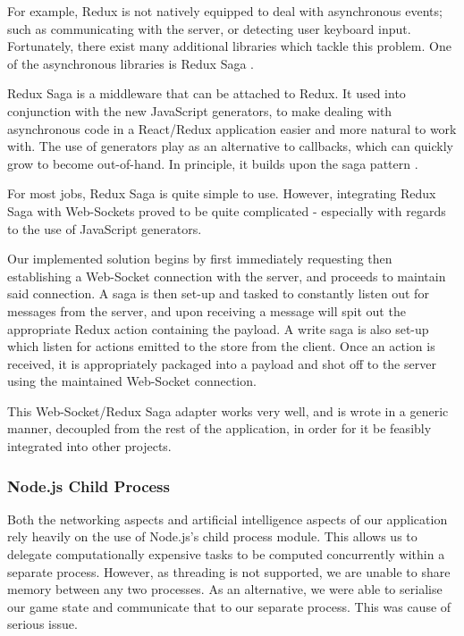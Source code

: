 \documentclass{standalone}
\begin{document}
				For example, Redux is not natively equipped to deal with asynchronous events; such as communicating with the server, or detecting user keyboard input. Fortunately, there exist many additional libraries which tackle this problem. One of the asynchronous libraries is Redux Saga \parencite{reduxSaga}.

				Redux Saga is a middleware that can be attached to Redux. It used into conjunction with the new JavaScript generators, to make dealing with asynchronous code in a React/Redux application easier and more natural to work with. The use of generators play as an alternative to callbacks, which can quickly grow to become out-of-hand. In principle, it builds upon the saga pattern \parencite{sagas}.

				For most jobs, Redux Saga is quite simple to use. However, integrating Redux Saga with Web-Sockets proved to be quite complicated - especially with regards to the use of JavaScript generators.

				Our implemented solution begins by first immediately requesting then establishing a Web-Socket connection with the server, and proceeds to maintain said connection. A saga is then set-up and tasked to constantly listen out for messages from the server, and upon receiving a message will spit out the appropriate Redux action containing the payload. A write saga is also set-up which listen for actions emitted to the store from the client. Once an action is received, it is appropriately packaged into a payload and shot off to the server using the maintained Web-Socket connection.

				This Web-Socket/Redux Saga adapter works very well, and is wrote in a generic manner, decoupled from the rest of the application, in order for it be feasibly integrated into other projects.

			\subsubsection{Node.js Child Process}
				Both the networking aspects and artificial intelligence aspects of our application rely heavily on the use of Node.js's child process module. This allows us to delegate computationally expensive tasks to be computed concurrently within a separate process. However, as threading is not supported, we are unable to share memory between any two processes. As an alternative, we were able to serialise our game state and communicate that to our separate process. This was cause of serious issue. 
\end{document}
